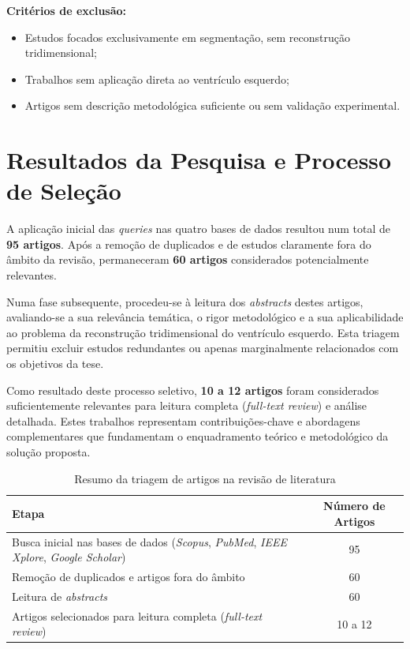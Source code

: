 \documentclass[12pt,a4paper]{report}
\begin{document}
\noindent\textbf{Critérios de exclusão:}
\begin{itemize}
    \item Estudos focados exclusivamente em segmentação, sem reconstrução tridimensional;
    \item Trabalhos sem aplicação direta ao ventrículo esquerdo;
    \item Artigos sem descrição metodológica suficiente ou sem validação experimental.
\end{itemize}

\section{Resultados da Pesquisa e Processo de Seleção}

A aplicação inicial das \textit{queries} nas quatro bases de dados resultou num total de \textbf{95 artigos}. Após a remoção de duplicados e de estudos claramente fora do âmbito da revisão, permaneceram \textbf{60 artigos} considerados potencialmente relevantes.

Numa fase subsequente, procedeu-se à leitura dos \textit{abstracts} destes artigos, avaliando-se a sua relevância temática, o rigor metodológico e a sua aplicabilidade ao problema da reconstrução tridimensional do ventrículo esquerdo. Esta triagem permitiu excluir estudos redundantes ou apenas marginalmente relacionados com os objetivos da tese.

Como resultado deste processo seletivo, \textbf{10 a 12 artigos} foram considerados suficientemente relevantes para leitura completa (\textit{full-text review}) e análise detalhada. Estes trabalhos representam contribuições-chave e abordagens complementares que fundamentam o enquadramento teórico e metodológico da solução proposta.

\begin{table}[h!]
\centering
\caption{Resumo da triagem de artigos na revisão de literatura}
\begin{tabular}{p{8cm} c}
\hline
\rowcolor{gray!30}
\textbf{Etapa} & \textbf{Número de Artigos} \\
\hline
Busca inicial nas bases de dados (\textit{Scopus}, \textit{PubMed}, \textit{IEEE Xplore}, \textit{Google Scholar}) & 95 \\
Remoção de duplicados e artigos fora do âmbito & 60 \\
Leitura de \textit{abstracts} & 60 \\
Artigos selecionados para leitura completa (\textit{full-text review}) & 10 a 12 \\
\hline
\end{tabular}
\end{table}
\end{document}
